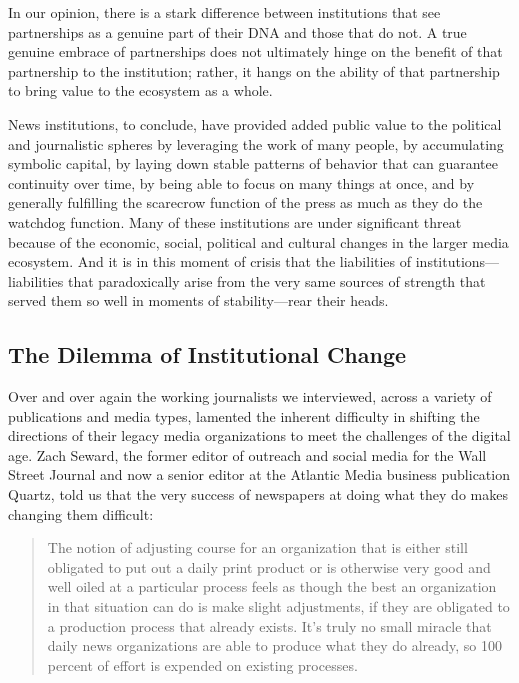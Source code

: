In our opinion, there is a stark difference between institutions that see
partnerships as a genuine part of their DNA and those that do not. A
true genuine embrace of partnerships does not ultimately hinge on
the benefit of that partnership to the institution; rather, it hangs on the
ability of that partnership to bring value to the ecosystem as a whole.

News institutions, to conclude, have provided added public value to the political
and journalistic spheres by leveraging the work of many people, by accumulating
symbolic capital, by laying down stable patterns of behavior that can guarantee
continuity over time, by being able to focus on many things at once, and by generally
fulfilling the scarecrow function of the press as much as they do the watchdog
function. Many of these institutions are under significant threat because of
the economic, social, political and cultural changes in the larger media ecosystem.
And it is in this moment of crisis that the liabilities of institutions—liabilities that
paradoxically arise from the very same sources of strength that served them so
well in moments of stability—rear their heads.

\subsection{The Dilemma of Institutional Change}
Over and over again the working journalists we interviewed, across a variety of
publications and media types, lamented the inherent difficulty in shifting the
directions of their legacy media organizations to meet the challenges of the digital
age. Zach Seward, the former editor of outreach and social media for the Wall
Street Journal and now a senior editor at the Atlantic Media business publication
Quartz, told us that the very success of newspapers at doing what they do makes
changing them difficult:

\begin{quote}The notion of adjusting course for an organization that is either still
obligated to put out a daily print product or is otherwise very good and
well oiled at a particular process feels as though the best an organization
in that situation can do is make slight adjustments, if they are obligated
to a production process that already exists. It’s truly no small miracle
that daily news organizations are able to produce what they do already,
so 100 percent of effort is expended on existing processes.
\end{quote}

